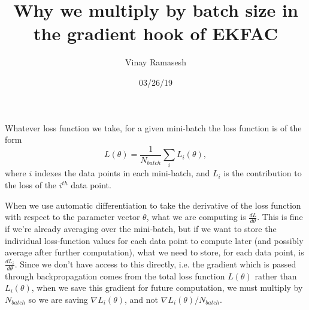 \documentclass[12pt]{article}
\title{Why we multiply by batch size in the gradient hook of EKFAC}
\author{Vinay Ramasesh}
\date{03/26/19}
\begin{document}
\maketitle

Whatever loss function we take, for a given mini-batch the loss function is of the form 
\begin{equation}
L(\theta) = \frac{1}{N_{batch}}\sum_i L_i(\theta),
\end{equation}
where $i$ indexes the data points in each mini-batch, and $L_i$ is the contribution to the loss of the $i^{th}$ data point.  

When we use automatic differentiation to take the derivative of the loss function with respect to the parameter vector $\theta$, what we are computing is $\frac{dL}{d\theta}$.  This is fine if we're already averaging over the mini-batch, but if we want to store the individual loss-function values for each data point to compute later (and possibly average after further computation), what we need to store, for each data point, is $\frac{dL_i}{d\theta}$.  Since we don't have access to this directly, i.e. the gradient which is passed through backpropagation comes from the total loss function $L(\theta)$ rather than $L_i(\theta)$, when we save this gradient for future computation, we must multiply by $N_{batch}$ so we are saving $\nabla L_i(\theta)$, and not $\nabla L_i(\theta)/N_{batch}$.
\end{document}
